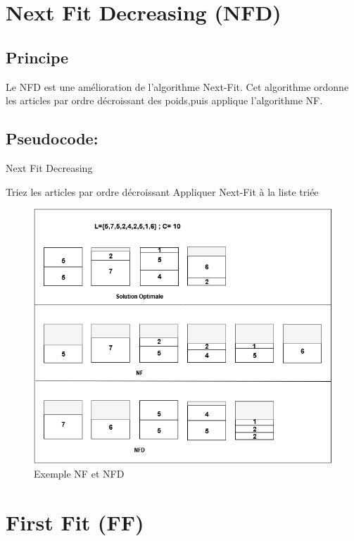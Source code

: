 \documentclass[12pt]{article}
\begin{document}
\section{Next Fit Decreasing (NFD)}
\subsection{Principe}
Le NFD est une amélioration de l’algorithme Next-Fit. Cet algorithme ordonne les articles par
 ordre décroissant des poids,puis applique l’algorithme NF.

\subsection{Pseudocode:}
\begin{algorithm}[!h]
    \caption{Next Fit Decreasing }
    \begin{algorithmic}
        \STATE Triez les articles par ordre décroissant\;
        \STATE Appliquer Next-Fit à la liste triée\;
    \end{algorithmic}
\end{algorithm}

\begin{figure}[H]
    \includegraphics[width=\linewidth]{../figures/NF NFD better(1).png}
    \caption{Exemple NF et NFD}
\end{figure}
\section{First Fit (FF)}
\end{document}
